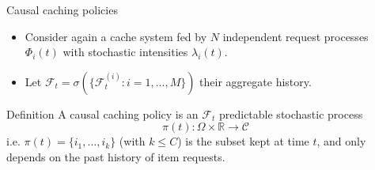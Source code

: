 \documentclass[aspectratio=169]{beamer}
\newenvironment*{myitem}[1][1.5em]{\begin{itemize}\setlength{\itemsep}{#1}}{\end{itemize}}
\begin{document}





		


\begin{frame}{Causal caching policies}
	
	\begin{myitem}[1em]
		\item Consider again a cache system fed by $N$ \alert{independent} request processes $\Phi_i(t)$ with stochastic intensities $\lambda_i(t)$.
		\item Let $\mathcal{F}_t = \sigma(\{\mathcal{F}_t^{(i)}: i=1,\ldots,M\})$ their aggregate history.
	\end{myitem}

	\vfill

	\begin{block}{Definition}
		A \alert{causal} caching policy is an $\mathcal{F}_t$ \alert{predictable} stochastic process
		\begin{equation*}
			\pi(t):\Omega\times\mathbb{R} \to \mathcal{C}
		\end{equation*}
		i.e. $\pi(t) = \{i_1,\ldots,i_k\}$ (with $k\leqslant C$) is the subset kept at time $t$, and only depends on the past history of item requests.
	\end{block}

\end{frame}
\end{document}
